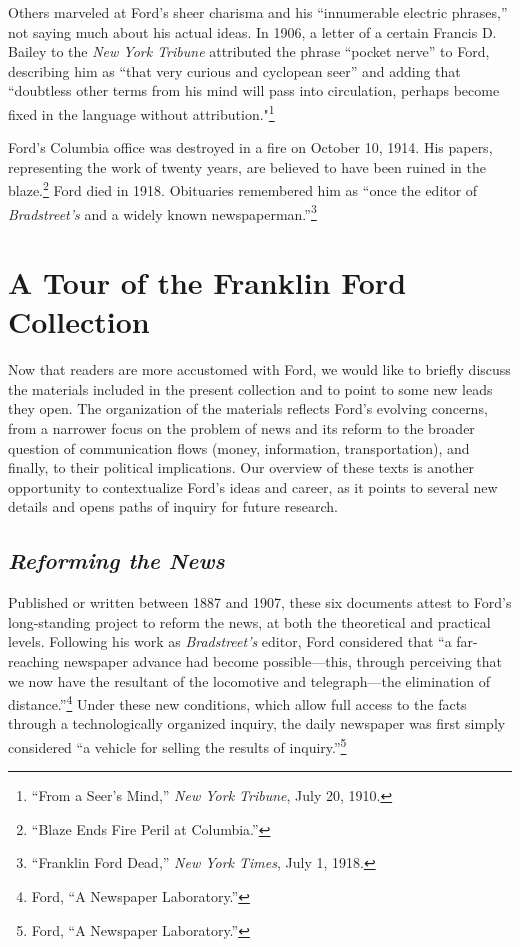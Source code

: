 \documentclass[openany,nobib]{tufte-book}
\begin{document}
\noindent Others marveled at Ford's sheer charisma and his ``innumerable electric
phrases,'' not saying much about his actual ideas. In 1906, a letter of
a certain Francis D. Bailey to the \emph{New York Tribune} attributed
the phrase ``pocket nerve'' to Ford, describing him as ``that very
curious and cyclopean seer'' and adding that ``doubtless other terms
from his mind will pass into circulation, perhaps become fixed in the
language without attribution."\footnote{``From a Seer's Mind,''
  \emph{New York Tribune}, July 20, 1910.}

Ford's Columbia office was destroyed in a fire on October 10, 1914. His
papers, representing the work of twenty years, are believed to have been
ruined in the blaze.\footnote{``Blaze Ends Fire Peril at Columbia.''}
Ford died in 1918. Obituaries remembered him as ``once the editor of
\emph{Bradstreet's} and a widely known newspaperman.''\footnote{``Franklin
  Ford Dead,'' \emph{New York Times}, July 1, 1918.}

\hypertarget{a-tour-of-the-franklin-ford-collection}{%
\section{A Tour of the Franklin Ford
Collection}\label{a-tour-of-the-franklin-ford-collection}}

Now that readers are more accustomed with Ford, we would like to briefly
discuss the materials included in the present collection and to point to
some new leads they open. The organization of the materials reflects
Ford's evolving concerns, from a narrower focus on the problem of news
and its reform to the broader question of communication flows (money,
information, transportation), and finally, to their political
implications. Our overview of these texts is another opportunity to
contextualize Ford's ideas and career, as it points to several new
details and opens paths of inquiry for future research.

\hypertarget{reforming-the-news}{%
\subsection{\texorpdfstring{\emph{Reforming the
News}}{Reforming the News}}\label{reforming-the-news}}

Published or written between 1887 and 1907, these six documents attest
to Ford's long-standing project to reform the news, at both the
theoretical and practical levels. Following his work as
\emph{Bradstreet's} editor, Ford considered that ``a far-reaching
newspaper advance had become possible---this, through perceiving that we
now have the resultant of the locomotive and telegraph---the elimination
of distance.''\footnote{Ford, ``A Newspaper Laboratory.''} Under these
new conditions, which allow full access to the facts through a
technologically organized inquiry, the daily newspaper was first simply
considered ``a vehicle for selling the results of inquiry.''\footnote{Ford,
  ``A Newspaper Laboratory.''}
\end{document}
